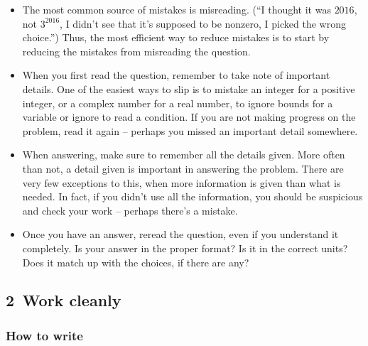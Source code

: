 \documentclass[10pt,paper=letter]{scrartcl}
\begin{document}
\begin{itemize}

\item The most common source of mistakes is misreading. (``I thought it was $2016$, not $3^{2016}$, I didn't see that it's supposed to be nonzero, I picked the wrong choice.'') Thus, the most efficient way to reduce mistakes is to start by reducing the mistakes from misreading the question.

\item When you first read the question, remember to take note of important details. One of the easiest ways to slip is to mistake an integer for a positive integer, or a complex number for a real number, to ignore bounds for a variable or ignore to read a condition. If you are not making progress on the problem, read it again -- perhaps you missed an important detail somewhere.

\item When answering, make sure to remember all the details given. More often than not, a detail given is important in answering the problem. There are very few exceptions to this, when more information is given than what is needed. In fact, if you didn't use all the information, you should be suspicious and check your work -- perhaps there's a mistake.

\item Once you have an answer, reread the question, even if you understand it completely. Is your answer in the proper format? Is it in the correct units? Does it match up with the choices, if there are any?

\end{itemize}

\subsection*{2 \,Work cleanly}

\subsubsection*{How to write}
\end{document}

